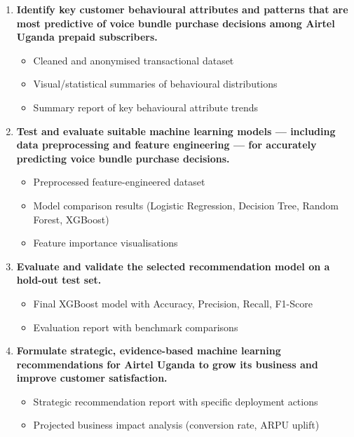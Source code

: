 \begin{enumerate}
    \item \textbf{Identify key customer behavioural attributes and patterns that are most predictive of voice bundle purchase decisions among Airtel Uganda prepaid subscribers.}
    \begin{itemize}
        \item Cleaned and anonymised transactional dataset
        \item Visual/statistical summaries of behavioural distributions
        \item Summary report of key behavioural attribute trends
    \end{itemize}

    \item \textbf{Test and evaluate suitable machine learning models --- including data preprocessing and feature engineering --- for accurately predicting voice bundle purchase decisions.}
    \begin{itemize}
        \item Preprocessed feature-engineered dataset
        \item Model comparison results (Logistic Regression, Decision Tree, Random Forest, XGBoost)
        \item Feature importance visualisations
    \end{itemize}

    \item \textbf{Evaluate and validate the selected recommendation model on a hold-out test set.}
    \begin{itemize}
        \item Final XGBoost model with Accuracy, Precision, Recall, F1-Score
        \item Evaluation report with benchmark comparisons
    \end{itemize}

    \item \textbf{Formulate strategic, evidence-based machine learning recommendations for Airtel Uganda to grow its business and improve customer satisfaction.}
    \begin{itemize}
        \item Strategic recommendation report with specific deployment actions
        \item Projected business impact analysis (conversion rate, ARPU uplift)
    \end{itemize}
\end{enumerate}

